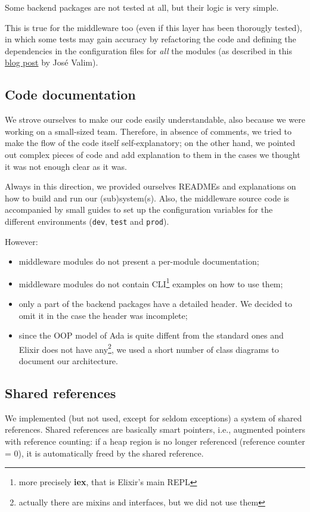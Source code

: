 Some backend packages are not tested at all, but their logic is very simple.

This is true for the middleware too (even if this layer has been thorougly
tested), in which some tests may gain accuracy by refactoring the code and
defining the dependencies in the configuration files for \textit{all} the
modules (as described in this
\href{http://blog.plataformatec.com.br/2015/10/mocks-and-explicit-contracts/}{blog post} by Jos\'e Valim).

\subsection{Code documentation}
We strove ourselves to make our code easily understandable, also because we
were working on a small-sized team.
Therefore, in absence of comments, we tried to make the flow of the code itself
self-explanatory; on the other hand, we pointed out complex pieces of code and
add explanation to them in the cases we thought it was not enough clear as it
was.

Always in this direction, we provided ourselves READMEs and explanations on how
to build and run our (sub)system(s). Also, the middleware source code is
accompanied by small guides to set up the configuration variables for the
different environments (\texttt{dev}, \texttt{test} and \texttt{prod}).

However:
\begin{itemize}
  \item middleware modules do not present a per-module documentation;
  \item middleware modules do not contain CLI\footnote{more precisely
    \textbf{iex}, that is Elixir's main REPL} examples on how to use them;
  \item only a part of the backend packages have a detailed header. We decided
    to omit it in the case the header was incomplete;
  \item since the OOP model of Ada is quite diffent from the standard ones and
    Elixir does not have any\footnote{actually there are mixins and
    interfaces, but we did not use them}, we used a short number of class
    diagrams to document our architecture.
\end{itemize}

\subsection{Shared references}
We implemented (but not used, except for seldom exceptions) a system of shared
references.
Shared references are basically smart pointers, i.e., augmented pointers with
reference counting: if a heap region is no longer referenced (reference counter = 0),
it is automatically freed by the shared reference.

